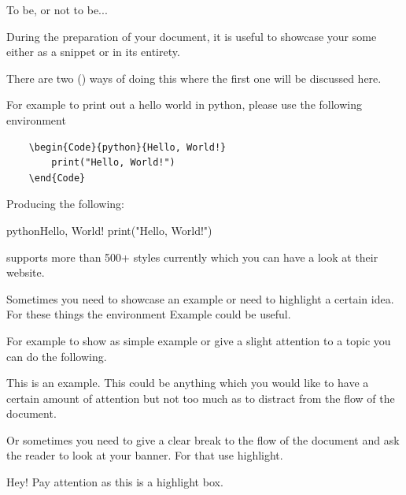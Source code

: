 \documentclass[minted, draw, cover = contour]{../tex/hebdomon}
\begin{document}
%
\begin{excerpt}
	To be, or not to be...
\end{excerpt}
%
\begin{hgitemize}
	\item[\pcode{Code}] During the preparation of your document, it is useful to showcase your
	some either as a snippet or in its entirety.
	\item[] There are two () ways of doing this where the first one will be discussed here.
	\item[] For example to print out a hello world in python, please use the following environment
\end{hgitemize}
%
\begin{verbatim}
	\begin{Code}{python}{Hello, World!}
		print("Hello, World!")
	\end{Code}
\end{verbatim}
%
Producing the following:
%

\begin{Code}{python}{Hello, World!}
	print("Hello, World!")
\end{Code}
%
 supports more than 500+ styles currently which you can have a
look at their website.
%
\begin{hgitemize}
	\item[\pcode{Example}] Sometimes you need to showcase an example or
	need to highlight a certain idea.
	For these things the environment Example could be useful.
	\item[] For example to show as simple example or give a slight attention to a topic you can do the following.
\end{hgitemize}
%
\begin{example}
	This is an example. This could be anything which you would like to have a certain amount of
	attention but not too much as to distract from the flow of the document.
\end{example}
%
\begin{hgitemize}
	\item[\pcode{Highlight}] Or sometimes you need to give a clear break to the flow of the
	document and ask the reader to look at your banner. For that use highlight.
\end{hgitemize}

\begin{highlight}
	Hey! Pay attention as this is a highlight box.
\end{highlight}
\end{document}
